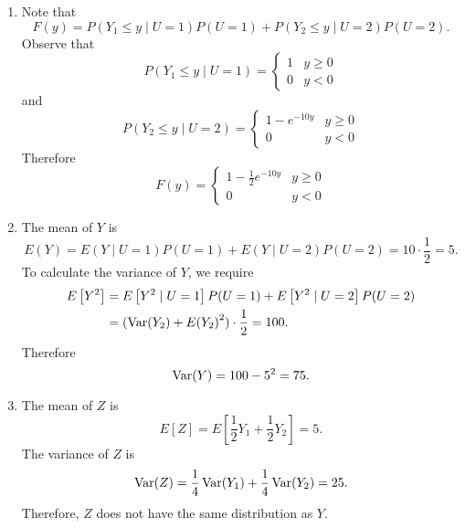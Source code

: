 \documentclass[notoc,notitlepage]{tufte-book}
\begin{document}
\begin{solution}
  \begin{enumerate}
    \item Note that
      \begin{equation*}
        F(y) = P( Y_1 \leq y \mid U = 1 ) P(U = 1) + P( Y_2 \leq y \mid U = 2 ) P(U = 2).
      \end{equation*}
      Observe that
      \begin{equation*}
        P(Y_1 \leq y \mid U = 1) = \begin{cases}
          1 & y \geq 0 \\
          0 & y < 0
        \end{cases}
      \end{equation*}
      and
      \begin{equation*}
        P(Y_2 \leq y \mid U = 2) = \begin{cases}
          1 - e^{-10y} & y \geq 0 \\
          0            & y < 0
        \end{cases}
      \end{equation*}
      Therefore
      \begin{equation*}
        F(y) = \begin{cases}
          1 - \frac{1}{2} e^{-10 y} & y \geq 0 \\
          0                         & y < 0
        \end{cases}
      \end{equation*}

    \item The mean of $Y$ is
      \begin{equation*}
        E(Y) = E(Y \mid U = 1) P(U = 1) + E(Y \mid U = 2) P(U = 2) = 10 \cdot \frac{1}{2} = 5.
      \end{equation*}
      To calculate the variance of $Y$, we require
      \begin{align*}
        E\left[Y^2\right] &= E\left[Y^2 \mid U = 1\right] P(U = 1) + E\left[Y^2 \mid U = 2\right] P(U = 2) \\
                          &= ( \operatorname{Var}(Y_2) + E{(Y_2)}^2 ) \cdot \frac{1}{2} = 100.
      \end{align*}
      Therefore
      \begin{equation*}
        \operatorname{Var}(Y) = 100 - 5^2 = 75.
      \end{equation*}

    \item The mean of $Z$ is
      \begin{equation*}
        E[Z] = E[ \frac{1}{2} Y_1 + \frac{1}{2} Y_2 ] = 5.
      \end{equation*}
      The variance of $Z$ is
      \begin{equation*}
        \operatorname{Var}(Z) = \frac{1}{4} \operatorname{Var}(Y_1) + \frac{1}{4} \operatorname{Var}(Y_2) = 25.
      \end{equation*}
      Therefore, $Z$ does not have the same distribution as $Y$.
  \end{enumerate}
\end{solution}
\end{document}
